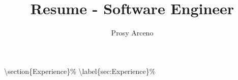 \documentclass{article}%
\title{Resume {-} Software Engineer}%
\author{Prosy Arceno}%
\begin{document}
%
\normalsize%
\textbackslash{}section\{Experience\}\%\newline%
\textbackslash{}label\{sec:Experience\}\%\newline%
%
\end{document}

